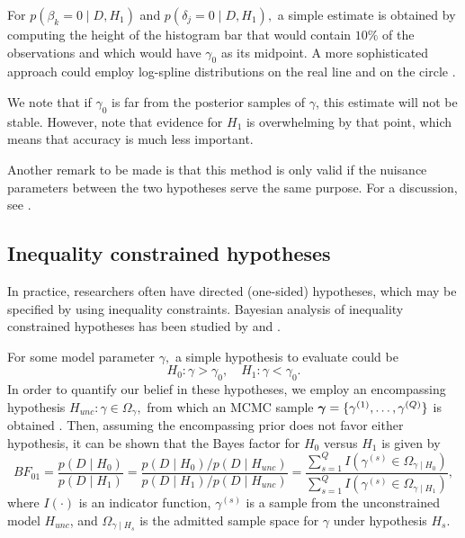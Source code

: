 For \( p(\beta_k = 0 \mid D, H_1) \) and \( p(\delta_j = 0 \mid D, H_1),\) a simple estimate is obtained by computing the height of the histogram bar that would contain \( 10 \% \) of the observations and which would have \( \gamma_0 \) as its midpoint. A more sophisticated approach could employ log-spline distributions on the real line \citep{stone1997polynomial} and on the circle \citep{ferreira2008directional}.

We note that if \( \gamma_0 \) is far from the posterior samples of \( \gamma \), this estimate will not be stable. However, \citet{wagenmakers2010sdd} note that evidence for \( H_1 \) is overwhelming by that point, which means that accuracy is much less important.

Another remark to be made is that this method is only valid if the nuisance parameters between the two hypotheses serve the same purpose. For a discussion, see \citet{consonni2008compatibility}.


\subsection{Inequality constrained hypotheses} \label{ineqhyptests}

In practice, researchers often have directed (one-sided) hypotheses, which may be specified by using inequality constraints. Bayesian analysis of inequality constrained hypotheses has been studied by \citet{klugkist2005inequality} and \citet{wetzels2010encompassing}.

For some model parameter \( \gamma,\) a simple hypothesis to evaluate could be \[ H_0 : \gamma > \gamma_0 , \quad H_1 : \gamma < \gamma_0.\]
In order to quantify our belief in these hypotheses, we employ an encompassing hypothesis \( H_{unc} : \gamma \in \Omega_\gamma,\) from which an MCMC sample \( \boldsymbol{\gamma} = \{ \gamma^{(1)}, \dots, \gamma^{(Q)} \} \) is obtained  \citep{klugkist2005inequality}. Then, assuming the encompassing prior does not favor either hypothesis, it can be shown that the Bayes factor for \( H_0 \) versus \( H_1 \) is given by
\begin{equation}
BF_{01} =
\frac{p(D \mid H_0)}{p(D \mid H_1)} =
\frac{p(D \mid H_0) / p(D \mid H_{unc})}{p(D \mid H_1) / p(D \mid H_{unc})} =
\frac{\sum_{s=1}^Q I\left(\gamma^{(s)} \in \Omega_{\gamma \mid H_0} \right)}{\sum_{s=1}^Q I\left(\gamma^{(s)} \in \Omega_{\gamma \mid H_1} \right)},
\end{equation}
where \( I(\cdot) \) is an indicator function, \( \gamma^{(s)} \) is a sample from the unconstrained model \( H_{unc} \), and \( \Omega_{\gamma \mid H_s} \) is the admitted sample space for \( \gamma \) under hypothesis \( H_s \).

